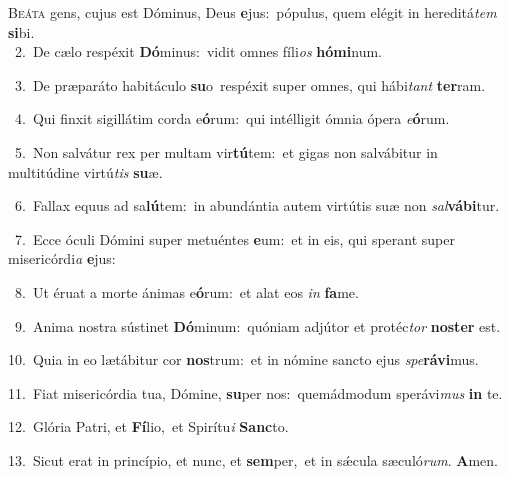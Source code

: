\lettrine{\initial\textcolor{\initialcolor}{B}}{eáta} gens, cujus est Dóminus, Deus \textbf{e}\-jus:~\star pópulus, quem elégit in hereditá\textit{tem} \textbf{si}\-bi.\\
{\numbfont\textcolor{\numbcolor}{~2.}}~De cælo respéxit \textbf{Dó}\-minus:~\star vidit omnes fíli\textit{os} \textbf{hó}\-\textbf{mi}num.\par
{\numbfont\textcolor{\numbcolor}{~3.}}~De præparáto habitáculo \textbf{su}\-o~\star respéxit super omnes, qui hábi\textit{tant} \textbf{ter}\-ram.\par
{\numbfont\textcolor{\numbcolor}{~4.}}~Qui finxit sigillátim corda e\-\textbf{ó}\-rum:~\star qui intélligit ómnia ópera \textit{e}\-\textbf{ó}rum.\par
{\numbfont\textcolor{\numbcolor}{~5.}}~Non salvátur rex per multam vir\-\textbf{tú}\-tem:~\star et gigas non salvábitur in multitúdine virtú\textit{tis} \textbf{su}\-æ.\par
{\numbfont\textcolor{\numbcolor}{~6.}}~Fallax equus ad sa\-\textbf{lú}\-tem:~\star in abundántia autem virtútis suæ non \textit{sal}\-\textbf{vá}\textbf{bi}tur.\par
{\numbfont\textcolor{\numbcolor}{~7.}}~Ecce óculi Dómini super metuéntes \textbf{e}\-um:~\star et in eis, qui sperant super misericórdi\textit{a} \textbf{e}\-jus:\par
{\numbfont\textcolor{\numbcolor}{~8.}}~Ut éruat a morte ánimas e\-\textbf{ó}\-rum:~\star et alat eos \textit{in} \textbf{fa}\-me.\par
{\numbfont\textcolor{\numbcolor}{~9.}}~Anima nostra sústinet \textbf{Dó}\-minum:~\star quóniam adjútor et protéc\textit{tor} \textbf{nos}\-\textbf{ter} est.\par
{\numbfont\textcolor{\numbcolor}{10.}}~Quia in eo lætábitur cor \textbf{nos}\-trum:~\star et in nómine sancto ejus \textit{spe}\-\textbf{rá}\textbf{vi}mus.\par
{\numbfont\textcolor{\numbcolor}{11.}}~Fiat misericórdia tua, Dómine, \textbf{su}\-per nos:~\star quemádmodum sperávi\textit{mus} \textbf{in} te.\par
{\numbfont\textcolor{\numbcolor}{12.}}~Glória Patri, et \textbf{Fí}\-lio,~\star et Spirítu\textit{i} \textbf{Sanc}\-to.\par
{\numbfont\textcolor{\numbcolor}{13.}}~Sicut erat in princípio, et nunc, et \textbf{sem}\-per,~\star et in sǽcula sæculó\-\textit{rum}\-. \textbf{A}\-men.\par
